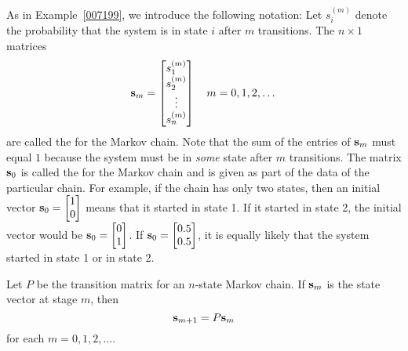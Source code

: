 \documentclass{ximera}
\begin{document}
As in Example~\ref{007199}, we introduce the following notation: Let $s_{i}^{(m)}$ denote the probability that the system is in state $i$ after $m$ transitions. The $n \times 1$ matrices
\begin{equation*}
{\bf s}_m = \begin{bmatrix}
s_{1}^{(m)} \\
s_{2}^{(m)} \\
\vdots \\
s_{n}^{(m)}
\end{bmatrix}
\quad m = 0, 1, 2, \dots
\end{equation*}
are called the  for the Markov chain. Note that the sum of the entries of ${\bf s}_{m}$ must equal $1$ because the system must be in \textit{some} state after $m$ transitions. The matrix ${\bf s}_{0}$ is called the  for the Markov chain and is given as part of the data of the particular chain. For example, if the chain has only two states, then an initial vector ${\bf s}_0 = \begin{bmatrix}
1 \\
0
\end{bmatrix}$
 means that it started in state 1. If it started in state 2, the initial vector would be ${\bf s}_0 = \begin{bmatrix}
0 \\
1
\end{bmatrix}$.
 If ${\bf s}_0 = \begin{bmatrix}
0.5 \\
0.5
\end{bmatrix}$, it is equally likely that the system started in state 1 or in state 2.

\begin{theorem}\label{007270}
Let $P$ be the transition matrix for an $n$-state Markov chain. If ${\bf s}_{m}$ is the state vector at stage $m$, then
\begin{equation*}
{\bf s}_{m+1} = P{\bf s}_m
\end{equation*}
for each $m = 0, 1, 2, \dots$.
\end{theorem}
\end{document}
